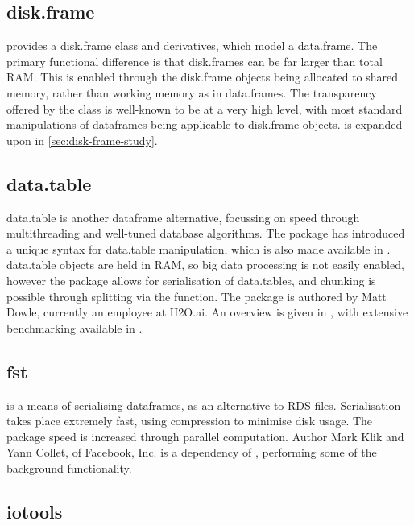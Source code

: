 \subsection{disk.frame}\label{subsec:disk.frame}

 provides a disk.frame class and derivatives, which model a
data.frame. The primary functional difference is that disk.frames can be
far larger than total RAM. This is enabled through the disk.frame
objects being allocated to shared memory, rather than working memory as
in data.frames. The transparency offered by the class is well-known to
be at a very high level, with most standard manipulations of dataframes
being applicable to disk.frame objects.  is expanded upon in \cref{sec:disk-frame-study}.

\subsection{data.table}\label{subsec:data.table}

data.table is another dataframe alternative, focussing on speed through
multithreading and well-tuned database algorithms\cite{dowle19}. The
package has introduced a unique syntax for data.table manipulation,
which is also made available in . data.table objects are held
in RAM, so big data processing is not easily enabled, however the
package allows for serialisation of data.tables, and chunking is
possible through splitting via the  function. The package
is authored by Matt Dowle, currently an employee at H2O.ai. An overview
is given in \cite{dowle19:_introd}, with extensive benchmarking
available in \cite{dowle19:_bench}.

\subsection{fst}\label{sec:fst}

 is a means of serialising dataframes, as an alternative to RDS
files\cite{klik19}. Serialisation takes place extremely fast, using
compression to minimise disk usage. The package speed is increased
through parallel computation. Author Mark Klik and Yann Collet, of
Facebook, Inc.  is a dependency of , performing some of the
background functionality.

\subsection{iotools}\label{subsec:iotools}

